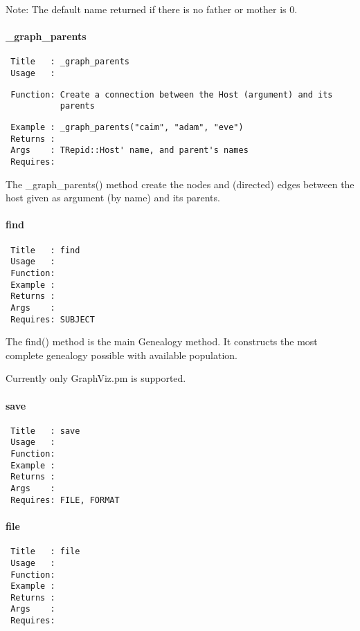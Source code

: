 Note: The default name returned if there is no father or mother is 0.

\paragraph*{\_graph\_parents\label{_graph_parents}}
\begin{verbatim}
 Title   : _graph_parents
 Usage   :
\end{verbatim}
\begin{verbatim}
 Function: Create a connection between the Host (argument) and its
           parents
\end{verbatim}
\begin{verbatim}
 Example : _graph_parents("caim", "adam", "eve")
 Returns : 
 Args    : TRepid::Host' name, and parent's names
 Requires:
\end{verbatim}


The \_graph\_parents() method create the nodes and (directed) edges
between the host given as argument (by name) and its parents.

\paragraph*{find\label{find}}
\begin{verbatim}
 Title   : find
 Usage   : 
 Function: 
 Example : 
 Returns : 
 Args    : 
 Requires: SUBJECT
\end{verbatim}


The find() method is the main Genealogy method. It constructs the most
complete genealogy possible with available population.



Currently only GraphViz.pm is supported.

\paragraph*{save\label{save}}
\begin{verbatim}
 Title   : save
 Usage   : 
 Function: 
 Example : 
 Returns : 
 Args    : 
 Requires: FILE, FORMAT
\end{verbatim}
\paragraph*{file\label{file}}
\begin{verbatim}
 Title   : file
 Usage   : 
 Function: 
 Example : 
 Returns : 
 Args    : 
 Requires:
\end{verbatim}
